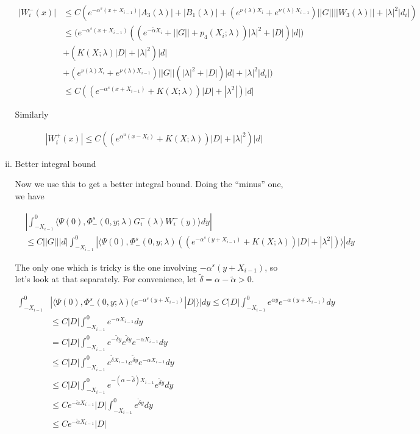 \documentclass[12pt]{article}
\begin{document}
\begin{enumerate}
\begin{enumerate}[(i)]
\begin{align*}
| W_i^-(x)| &\leq C \left( e^{-\alpha^s(x + X_{i-1})} |A_3(\lambda)| + |B_1(\lambda)| + (e^{\nu(\lambda)X_i} + e^{\nu(\lambda)X_{i-1}} )||G|| ||W_3(\lambda)|| + |\lambda|^2 |d_i|  \right) \\
&\leq \Big( e^{-\alpha^s(x + X_{i-1})}( (e^{-\tilde{\alpha} X_i} + ||G|| + p_4(X_i; \lambda) ) |\lambda|^2  + |D|)|d|) \\
&+ ( K(X; \lambda) |D|+ |\lambda|^2 )|d| \\
&+ (e^{\nu(\lambda)X_i} + e^{\nu(\lambda)X_{i-1}} )||G|| ( |\lambda|^2 + |D|)|d| + |\lambda|^2 |d_i| \Big) \\
&\leq C( (e^{-\alpha^s(x + X_{i-1})} + K(X; \lambda))|D| + |\lambda^2|)|d|
\end{align*}

Similarly

\begin{align*}
| W_i^+(x)| \leq C ( (e^{\alpha^u(x - X_i)} + K(X; \lambda))|D| + |\lambda|^2 )|d|
\end{align*}

\item Better integral bound

Now we use this to get a better integral bound. Doing the ``minus'' one, we have

\begin{align*}
&\left| \int_{-X_{i-1}}^0 \langle \Psi(0), \Phi^s_-(0, y; \lambda) G_i^-(\lambda)W_i^-(y) \rangle dy \right| \\
&\leq C ||G|| |d| \int_{-X_{i-1}}^0 | \langle \Psi(0), \Phi^s_-(0, y; \lambda) ( (e^{-\alpha^s(y + X_{i-1})} + K(X; \lambda))|D| + |\lambda^2|) \rangle | dy
\end{align*}

The only one which is tricky is the one involving ${-\alpha^s(y + X_{i-1})}$, so let's look at that separately. For convenience, let $\tilde{\delta} = \alpha - \tilde{\alpha} > 0$.

\begin{align*}
\int_{-X_{i-1}}^0 &| \langle \Psi(0), \Phi^s_-(0, y; \lambda) (e^{-\alpha^s(y + X_{i-1})} |D| \rangle | dy \leq C |D| \int_{-X_{i-1}}^0 e^{\alpha y} e^{-\alpha(y + X_{i-1})} dy \\
&\leq C |D| \int_{-X_{i-1}}^0 e^{-\alpha X_{i-1}} dy \\
&= C |D| \int_{-X_{i-1}}^0 e^{-\tilde{\delta} y} e^{\tilde{\delta} y}  e^{-\alpha X_{i-1}} dy \\
&\leq C |D| \int_{-X_{i-1}}^0 e^{\tilde{\delta} X_{i-1}} e^{\tilde{\delta} y}  e^{-\alpha X_{i-1}} dy \\
&\leq C |D| \int_{-X_{i-1}}^0 e^{-(\alpha - \tilde{\delta}) X_{i-1}} e^{\tilde{\delta} y} dy \\
&\leq C e^{-\tilde{\alpha} X_{i-1}} |D| \int_{-X_{i-1}}^0 e^{\tilde{\delta} y} dy \\
&\leq C e^{-\tilde{\alpha} X_{i-1}} |D|
\end{align*}


\end{enumerate}
\end{enumerate}
\end{document}
